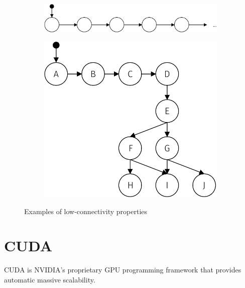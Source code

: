 \documentclass[
fancyheadings, %
%
%
]{stsreprt}
\begin{document}
\begin{figure}
    \begin{subfigure}[b]{.5\textwidth}
        \centering
        \includegraphics[width=\textwidth]{figures/lc-ex-generally-linear}
        \label{fig:lc-ex-generally-linear}
    \end{subfigure}
    \begin{subfigure}[b]{.5\textwidth}
        \centering
        \includegraphics[width=.9\textwidth]{figures/lc-ex-bottleneck}
        \label{fig:lc-ex-bottleneck}
    \end{subfigure}
    \caption{Examples of low-connectivity properties}
    \label{fig:lc-ex}
\end{figure}

\section{CUDA}
\label{section:background:cuda}

CUDA is NVIDIA's proprietary GPU programming framework that provides automatic massive scalability.
\end{document}
